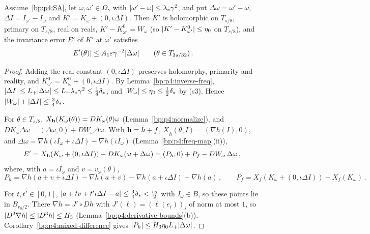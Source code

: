 \begin{lemma}\label{bp:p4:lip-error}
Assume~\eqref{bp:p4:SA}, let $\omega,\omega'\in\Omega_\gamma$ with $\lvert \omega'-\omega\rvert\le\lambda_*\gamma^2$,
and put $\Delta\omega=\omega'-\omega$, $\Delta I=I_{\omega'}-I_\omega$ and
$K'=K_\omega+(0,\iota\Delta I)$. Then $K'$ is holomorphic on $T_{s/8}$, primary on $T_{s/8}$, real
on reals, $K'-K^0_{\omega'}=W_\omega$ (so $\lvert K'-K^0_{\omega'}\rvert\le\eta_0$ on $T_{s/8}$), and the
invariance error $E'$ of $K'$ at $\omega'$ satisfies
\begin{equation*}
\lvert E'(\theta)\rvert\le A_1\varepsilon\gamma^{-2}\lvert \Delta\omega\rvert\qquad(\theta\in T_{3s/32})\,.
\end{equation*}
\end{lemma}

\begin{proof}
\label{step:p4:le-basic}
Adding the real constant $(0,\iota\Delta I)$ preserves holomorphy, primarity and reality, and
$K^0_{\omega'}=K^0_\omega+(0,\iota\Delta I)$. By Lemma~\ref{bp:p4:inverse-freq},
$\lvert \Delta I\rvert\le L_{+}\lvert \Delta\omega\rvert\le L_{+}\lambda_*\gamma^2\le\frac14\delta_*$, and
$\lvert W_\omega\rvert\le\eta_0\le\frac12\delta_*$ by (s3). Hence $\lvert W_\omega\rvert+\lvert \Delta I\rvert\le\frac34\delta_*$.

\label{step:p4:le-split}
For $\theta\in T_{s/8}$, $X_{\mathbf{h}}(K_\omega(\theta))=DK_\omega(\theta)\omega$ (Lemma~\ref{bp:p4:normalize}),
and $DK_\omega\Delta\omega=(\Delta\omega,0)+DW_\omega\Delta\omega$. With $\mathbf{h}=\tilde h+f$,
$X_{\tilde h}(\theta,I)=(\nabla h(I),0)$, and
$\Delta\omega=\nabla h(\iota I_\omega+\iota\Delta I)-\nabla h(\iota I_\omega)$
(Lemma~\ref{bp:p4:freq-map}(ii)),
\begin{equation*}
E'=X_{\mathbf{h}}(K_\omega+(0,\iota\Delta I))-DK_\omega(\omega+\Delta\omega)=(P_h,0)+P_f-DW_\omega\,\Delta\omega\,,
\end{equation*}
where, with $a=\iota I_\omega$ and $v=v_\omega(\theta)$,
\begin{equation*}
P_h=\nabla h(a+v+\iota\Delta I)-\nabla h(a+v)-\nabla h(a+\iota\Delta I)+\nabla h(a)\,,\qquad
P_f=X_f(K_\omega+(0,\iota\Delta I))-X_f(K_\omega)\,.
\end{equation*}

\label{step:p4:le-h}
For $t,t'\in[0,1]$, $\lvert a+tv+t'\iota\Delta I-a\rvert\le\frac34\delta_*<\frac{r_0}2$ with $I_\omega\in B$,
so these points lie in $B_{r_0/2}$. There $\nabla h=J'\circ Dh$ with
$J'(\ell)=(\ell(e_i))_i$ of norm at most $1$, so $\lvert D^2\nabla h\rvert\le\lvert D^3h\rvert\le H_3$
(Lemma~\ref{bp:p4:derivative-bounds}(b)). Corollary~\ref{bp:p4:mixed-difference} gives
$\lvert P_h\rvert\le H_3\eta_0L_{+}\lvert \Delta\omega\rvert$.


\end{proof}
